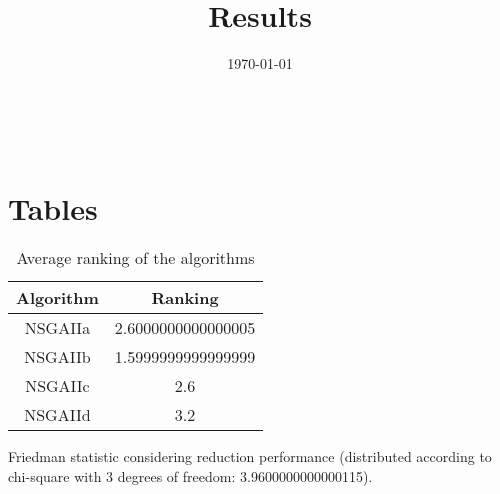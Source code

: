 \documentclass{article}
\title{Results}
\author{}
\date{\today}
\begin{document}
\oddsidemargin 0in \topmargin 0in\maketitle
\
\section{Tables}
\begin{table}[!htp]
\centering
\caption{Average ranking of the algorithms}
\begin{tabular}{c|c}
Algorithm&Ranking\\
\hline
NSGAIIa&2.6000000000000005\\
NSGAIIb&1.5999999999999999\\
NSGAIIc&2.6\\
NSGAIId&3.2\\
\end{tabular}
\end{table}


Friedman statistic considering reduction performance (distributed according to chi-square with 3 degrees of freedom: 3.9600000000000115).
\end{document}
